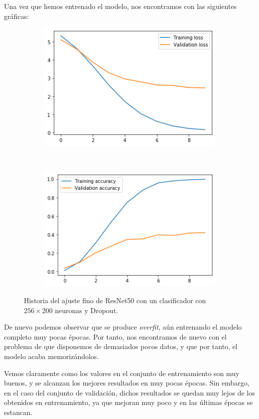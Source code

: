\documentclass[11pt,a4paper]{article}
\begin{document}
Una vez que hemos entrenado el modelo, nos encontramos con las siguientes gráficas:

\begin{figure}[H]
  \centering
  \begin{subfigure}{.5\textwidth}
    \centering
    \includegraphics[scale=0.4]{img/fine1-loss.png}
    \label{fig:fine1-loss}
  \end{subfigure}%
  ~ \quad
  \begin{subfigure}{.5\textwidth}
    \centering
    \includegraphics[scale=0.4]{img/fine1-acc.png}
    \label{fig:fine1-acc}
  \end{subfigure}
  \caption{Historia del ajuste fino de ResNet50 con un clasificador con $256 \times 200$ neuronas y Dropout.}
  \label{fig:history-fine1}
\end{figure}

De nuevo podemos observar que se produce \textit{overfit}, aún entrenando el modelo
completo muy pocas épocas. Por tanto, nos encontramos de nuevo con el problema de que
disponemos de demasiados pocos datos, y que por tanto, el modelo acaba memorizándolos.

Vemos claramente como los valores en el conjunto de entrenamiento son muy buenos, y se
alcanzan los mejores resultados en muy pocas épocas. Sin embargo, en el caso
del conjunto de validación, dichos resultados se quedan muy lejos de los obtenidos
en entrenamiento, ya que mejoran muy poco y en las últimas épocas se estancan.
\end{document}
